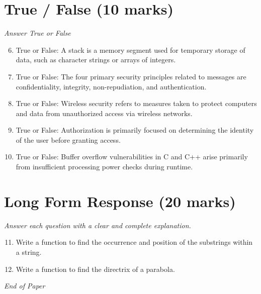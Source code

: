 \documentclass[12pt]{article}
\begin{document}
\section*{True / False (10 marks)}
\textit{Answer True or False}
\begin{enumerate}[label=\arabic*.]
\setcounter{enumi}{5}
\item True or False: A stack is a memory segment used for temporary storage of data, such as character strings or arrays of integers.
\item True or False: The four primary security principles related to messages are confidentiality, integrity, non-repudiation, and authentication.
\item True or False: Wireless security refers to measures taken to protect computers and data from unauthorized access via wireless networks.
\item True or False: Authorization is primarily focused on determining the identity of the user before granting access.
\item True or False: Buffer overflow vulnerabilities in C and C++ arise primarily from insufficient processing power checks during runtime.
\end{enumerate}

\section*{Long Form Response (20 marks)}
\textit{Answer each question with a clear and complete explanation.}
\begin{enumerate}[label=\arabic*.]
\setcounter{enumi}{10}
\item Write a function to find the occurrence and position of the substrings within a string.
\item Write a function to find the directrix of a parabola.
\end{enumerate}

\vfill
\noindent\textit{End of Paper}
\end{document}
